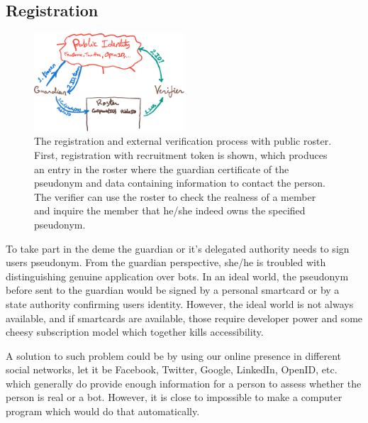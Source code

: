 \documentclass[12pt,a4paper]{article}
\let\Oldsubsection\subsection
\renewcommand{\subsection}{\FloatBarrier\Oldsubsection}
\let\oldincludegraphics\includegraphics
\renewcommand{\includegraphics}[1]{\oldincludegraphics[width=0.5\textwidth]{#1}}
\begin{document}
\subsection{Registration}
\begin{figure}
\centering
\includegraphics{figures/registration}
\caption{The registration and external verification process with public roster. First, registration with recruitment token is shown, which produces an entry in the roster where the guardian certificate of the pseudonym and data containing information to contact the person. The verifier can use the roster to check the realness of a member and inquire the member that he/she indeed owns the specified pseudonym.}
\end{figure}
\par
To take part in the deme the guardian or it's delegated authority needs to sign users pseudonym. From the guardian perspective, she/he is troubled with distinguishing genuine application over bots. In an ideal world, the pseudonym before sent to the guardian would be signed by a personal smartcard or by a state authority confirming users identity. However, the ideal world is not always available, and if smartcards are available, those require developer power and some cheesy subscription model which together kills accessibility.\par
A solution to such problem could be by using our online presence in different social networks, let it be Facebook, Twitter, Google, LinkedIn, OpenID, etc. which generally do provide enough information for a person to assess whether the person is real or a bot. However, it is close to impossible to make a computer program which would do that automatically.\par
\end{document}
